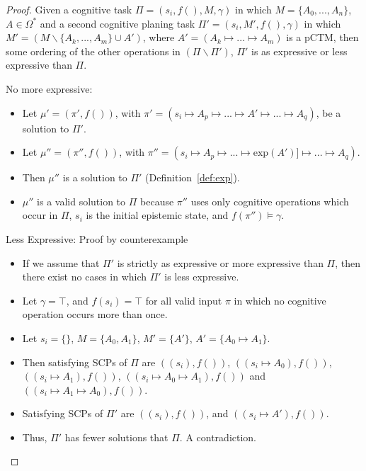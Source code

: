 \begin{proof} \label{proof:aggregateExpressiveness}
Given a cognitive task $\Pi=(s_i,f(), M, \gamma)$ in which $M=\{A_0,...,A_n\}$, $A\in\Omega^*$ and a second cognitive planing task $\Pi'=(s_i,M',f(),\gamma)$ in which $M'= (M \smallsetminus \{A_k,...,A_m\} \cup A')$, where $A'=(A_k \longmapsto... \longmapsto A_m)$ is a pCTM, then some ordering of the other operations in $(\Pi \smallsetminus \Pi')$, $\Pi'$ is as expressive or less expressive than $\Pi$.

\item No more expressive:
\begin{itemize}
\item Let $\mu'=(\pi',f())$, with $\pi' = (s_i\longmapsto A_p \longmapsto ... \longmapsto A' \longmapsto ... \longmapsto A_q)$, be a solution to $\Pi'$.
\item Let $\mu''=(\pi'',f())$, with $\pi'' = (s_i\longmapsto A_p \longmapsto ... \longmapsto \text{exp}(A')] \longmapsto ... \longmapsto A_q)$.
\item Then $\mu''$ is a solution to $\Pi'$ (Definition~\ref{def:exp}).
\item $\mu''$ is a valid solution to $\Pi$ because $\pi''$ uses only cognitive operations which occur in $\Pi$, $s_i$ is the initial epistemic state, and $f(\pi'') \models \gamma$. 
\end{itemize}
\item Less Expressive: Proof by counterexample
\begin{itemize}
\item If we assume that $\Pi'$ is strictly as expressive or more expressive than $\Pi$, then there exist no cases in which $\Pi'$ is less expressive.
\item Let $\gamma = \top$, and $f(s_i)=\top$ for all valid input $\pi$ in which no cognitive operation occurs more than once.
\item Let $s_i=\{\}$, $M=\{A_0,A_1\}$, $M'=\{A'\}$, $A'=\{A_0\longmapsto A_1\}$.
\item Then satisfying SCPs of $\Pi$ are $((s_i),f())$, $((s_i \longmapsto A_0),f())$, $((s_i \longmapsto A_1),f())$, $((s_i \longmapsto A_0\longmapsto A_1),f())$ and $((s_i \longmapsto A_1\longmapsto A_0),f())$.
\item Satisfying SCPs of $\Pi'$ are $((s_i),f())$, and $((s_i \longmapsto A'),f())$.
\item Thus, $\Pi'$ has fewer solutions that $\Pi$. A contradiction.
\end{itemize}
\end{proof}


